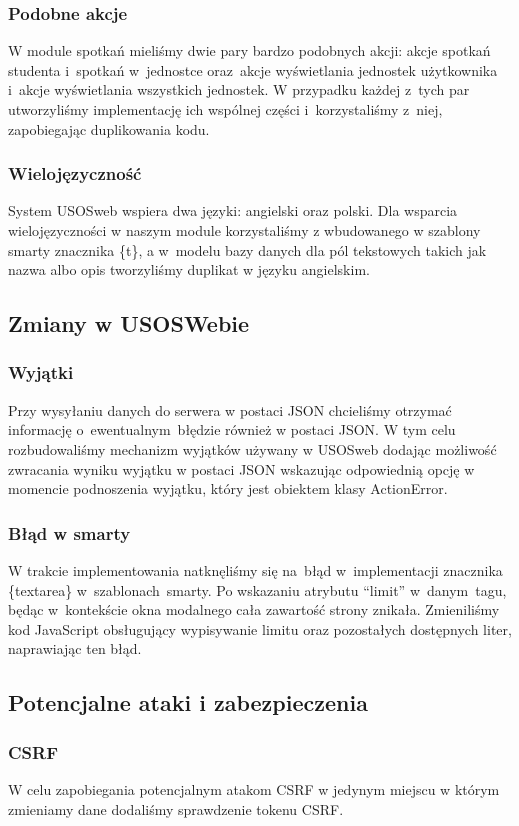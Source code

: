 \documentclass[licencjacka]{pracamgr}
\begin{document}
\begin{itemize}
\subsubsection{Podobne akcje}
W module spotkań mieliśmy dwie pary bardzo podobnych akcji: akcje spotkań studenta i~spotkań w~jednostce oraz~akcje wyświetlania jednostek użytkownika i~akcje wyświetlania wszystkich jednostek. W przypadku każdej z~tych par utworzyliśmy implementację ich wspólnej części i~korzystaliśmy z~niej, zapobiegając duplikowania kodu.
\subsubsection{Wielojęzyczność}
System USOSweb wspiera dwa języki: angielski oraz polski. Dla wsparcia wielojęzyczności w naszym module korzystaliśmy z wbudowanego w szablony smarty znacznika \{t\}, a w~modelu bazy danych dla pól tekstowych takich jak nazwa albo opis tworzyliśmy duplikat w języku angielskim.
\subsection{Zmiany w USOSWebie}
\subsubsection{Wyjątki}
Przy wysyłaniu danych do serwera w postaci JSON chcieliśmy otrzymać informację o~ewentualnym~błędzie również w postaci JSON. W tym celu rozbudowaliśmy mechanizm wyjątków używany w USOSweb dodając możliwość zwracania wyniku wyjątku w postaci JSON wskazując odpowiednią opcję w momencie podnoszenia wyjątku, który jest obiektem klasy ActionError.
\subsubsection{Błąd w smarty}
W trakcie implementowania natknęliśmy się na~błąd w~implementacji znacznika \{textarea\} w~szablonach~smarty. Po wskazaniu atrybutu \enquote{limit} w~danym~tagu, będąc w~kontekście okna modalnego cała zawartość strony znikała. Zmieniliśmy kod JavaScript obsługujący wypisywanie limitu oraz pozostałych dostępnych liter, naprawiając ten błąd.
\subsection{Potencjalne ataki i zabezpieczenia} \label{subsec:bezpiecz}
\subsubsection{CSRF}
W celu zapobiegania potencjalnym atakom CSRF w jedynym miejscu w którym zmieniamy dane dodaliśmy sprawdzenie tokenu CSRF.

\end{itemize}
\end{document}
